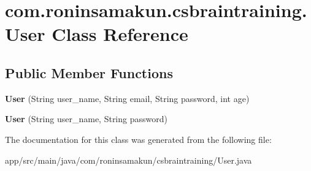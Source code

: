 \section{com.\+roninsamakun.\+csbraintraining.\+User Class Reference}
\label{classcom_1_1roninsamakun_1_1csbraintraining_1_1_user}
\subsection*{Public Member Functions}
\begin{DoxyCompactItemize}
\item 
{\bfseries User} (String user\+\_\+name, String email, String password, int age)\label{classcom_1_1roninsamakun_1_1csbraintraining_1_1_user_a3d23736ef0a21035c32ca462ca617739}

\item 
{\bfseries User} (String user\+\_\+name, String password)\label{classcom_1_1roninsamakun_1_1csbraintraining_1_1_user_a0b90977ebcdbf7f18b7a539b6583bab1}

\end{DoxyCompactItemize}


The documentation for this class was generated from the following file\+:\begin{DoxyCompactItemize}
\item 
app/src/main/java/com/roninsamakun/csbraintraining/User.\+java\end{DoxyCompactItemize}
